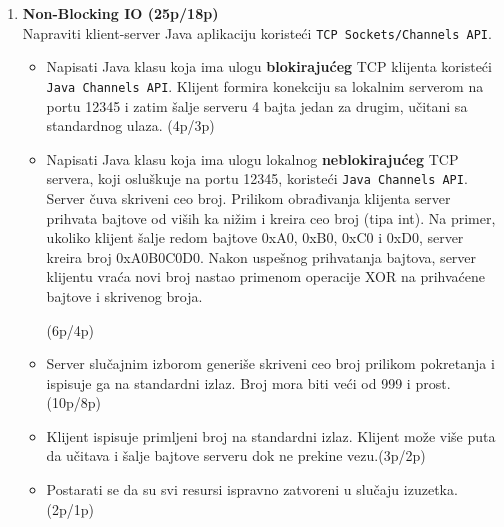 \documentclass[]{article}
\begin{document}
\begin{enumerate}
\newpage

\item \textbf{Non-Blocking IO (25p/18p)}
\\Napraviti klient-server Java aplikaciju koriste\'c{}i \texttt{TCP Sockets/Channels API}.
\begin{itemize}
    \item Napisati Java klasu koja ima ulogu \textbf{blokiraju\'c{}eg} TCP klijenta koriste\'c{}i \texttt{Java Channels API}. Klijent formira konekciju sa lokalnim serverom na portu 12345 i zatim \v{s}alje serveru 4 bajta jedan za drugim, učitani sa standardnog ulaza. \hfill (4p/3p)
    \item Napisati Java klasu koja ima ulogu lokalnog \textbf{neblokiraju\'c{}eg} TCP servera, koji oslu\v{s}kuje na portu 12345, koriste\'c{}i \texttt{Java Channels API}. Server čuva skriveni ceo broj. Prilikom obrađivanja klijenta server prihvata bajtove od viših ka nižim i kreira ceo broj (tipa int). Na primer, ukoliko klijent šalje redom bajtove 0xA0, 0xB0, 0xC0 i 0xD0, server kreira broj 0xA0B0C0D0.
%      
Nakon uspešnog prihvatanja bajtova, server klijentu vraća novi broj nastao primenom operacije XOR na prihvaćene bajtove i skrivenog broja. 
      
   \hfill (6p/4p)
    \item Server slučajnim izborom generiše skriveni ceo broj prilikom pokretanja i ispisuje ga na standardni izlaz. Broj mora biti veći od 999 i prost. \hfill (10p/8p)
    \item  Klijent ispisuje primljeni broj na standardni izlaz. Klijent može više puta da učitava i šalje bajtove serveru dok ne prekine vezu.\hfill (3p/2p)
     \item Postarati se da su svi resursi ispravno zatvoreni u slu\v{c}aju izuzetka. \hfill (2p/1p)
  \end{itemize}

\end{enumerate}
\end{document}
